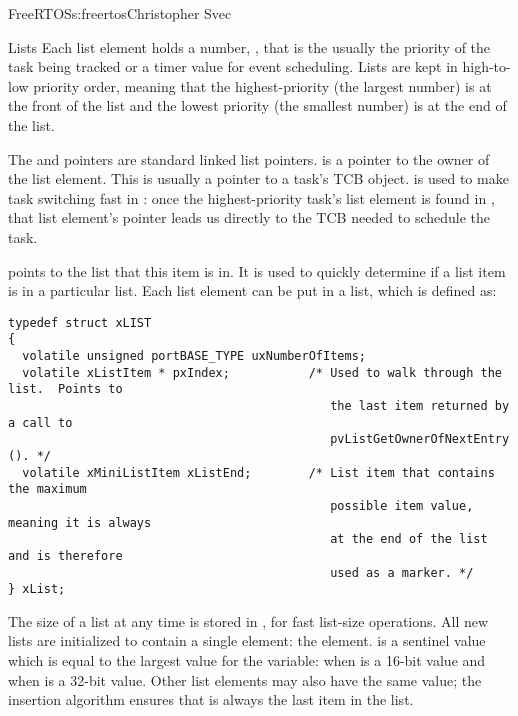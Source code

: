 \begin{aosachapter}{FreeRTOS}{s:freertos}{Christopher Svec}
\begin{aosasect1}{Lists}
Each list element holds a number, , that is the
usually the priority of the task being tracked or a timer value for
event scheduling.  Lists are kept in high-to-low priority order,
meaning that the highest-priority  (the largest number) is
at the front of the list and the lowest priority  (the
smallest number) is at the end of the list.

The  and  pointers are standard linked
list pointers.   is a pointer to the owner of the list element. This is
usually a pointer to a task's TCB object.  is used to
make task switching fast in : once the
highest-priority task's list element is found in
, that list element's  pointer
leads us directly to the TCB needed to schedule the task.

 points to the list that this item is in. It is used
to quickly determine if a list item is in a particular list.  Each
list element can be put in a list, which is defined as:

\begin{verbatim}
typedef struct xLIST
{
  volatile unsigned portBASE_TYPE uxNumberOfItems;
  volatile xListItem * pxIndex;           /* Used to walk through the list.  Points to
                                             the last item returned by a call to 
                                             pvListGetOwnerOfNextEntry (). */
  volatile xMiniListItem xListEnd;        /* List item that contains the maximum 
                                             possible item value, meaning it is always
                                             at the end of the list and is therefore 
                                             used as a marker. */
} xList;
\end{verbatim}

The size of a list at any time is stored in , for
fast list-size operations.
All new lists are initialized to contain a single element: the
 element.   is a sentinel
value which is equal to the largest value for the 
variable:  when  is a 16-bit value and
 when  is a 32-bit value. Other list
elements may also have the same value; the insertion algorithm ensures
that  is always the last item in the list.
 

\end{aosasect1}
\end{aosachapter}
